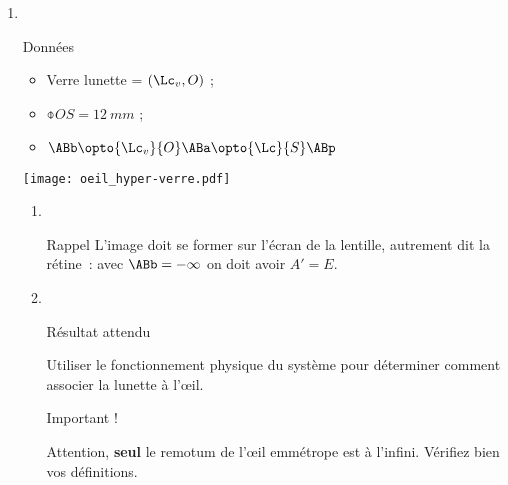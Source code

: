 \documentclass[a4paper, 12pt, final, garamond]{book}
\begin{document}
\begin{enumerate}
    \item ~
        \begin{center}
            \begin{NCdefi}[width=.9\linewidth, sidebyside]{Données}
                \begin{itemize}
                    \item Verre lunette = $(\Lc_v, O)$ ;
                    \item $\obar{OS} = \SI{12}{mm}$ ;
                    \item $\ABb \opto{\Lc_v}{O} \ABa \opto{\Lc}{S} \ABp$
                \end{itemize}
                \tcblower
                \begin{center}
                    \texttt{[image: oeil\_hyper-verre.pdf]}
                \end{center}
            \end{NCdefi}
        \end{center}
        \begin{enumerate}
            \item ~
                \begin{center}
                    \begin{NCdemo}[width=.5\linewidth]{Rappel}
                        L'image doit se former sur l'écran de la lentille,
                        autrement dit la rétine~: avec $\ABb = -\infty$ on doit
                        avoir $A' = E$.
                    \end{NCdemo}
                \end{center}
            \item ~
                \begin{tcbraster}[raster columns=7, raster equal height=rows]
                    \begin{NCprop}[raster multicolumn=2]{Résultat attendu}

                        Utiliser le fonctionnement physique du système pour
                        déterminer comment associer la lunette à l'œil.

                    \end{NCprop}
                    \begin{NCror}[raster multicolumn=2]{Important !}

                        Attention, \textbf{seul} le remotum de l'œil emmétrope
                        est à l'infini. Vérifiez bien vos définitions.


\end{NCror}
\end{tcbraster}
\end{enumerate}
\end{enumerate}
\end{document}
